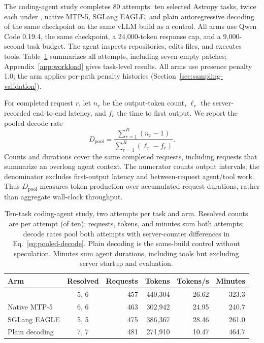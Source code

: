 The coding-agent study completes 80 attempts: ten selected Astropy tasks, twice each under \sys{}, native MTP-5, SGLang EAGLE, and plain autoregressive decoding of the same checkpoint on the same vLLM build as a control. All arms use Qwen Code 0.19.4, the same checkpoint, a 24,000-token response cap, and a 9,000-second task budget. The agent inspects repositories, edits files, and executes tools. Table~\ref{tab:agent-study} summarizes all attempts, including seven empty patches; Appendix~\ref{app:workload} gives task-level results. All arms use presence penalty 1.0; the \sys{} arm applies per-path penalty histories (Section~\ref{sec:sampling-validation}).

For completed request $r$, let $n_r$ be the output-token count, $\ell_r$ the server-recorded end-to-end latency, and $f_r$ the time to first output. We report the pooled decode rate
\begin{equation}
 D_{\mathrm{pool}} =
 \frac{\sum_{r=1}^{R}(n_r-1)}{\sum_{r=1}^{R}(\ell_r-f_r)}.
 \label{eq:pooled-decode}
\end{equation}
Counts and durations cover the same completed requests, including requests that summarize an overlong agent context. The numerator counts output intervals; the denominator excludes first-output latency and between-request agent/tool work. Thus $D_{\mathrm{pool}}$ measures token production over accumulated request durations, rather than aggregate wall-clock throughput.

\begin{table}[t]
\caption{Ten-task coding-agent study, two attempts per task and arm. Resolved counts are per attempt (of ten); requests, tokens, and minutes sum both attempts; decode rates pool both attempts with server-counter differences in Eq.~\ref{eq:pooled-decode}. Plain decoding is the same-build control without speculation. Minutes sum agent durations, including tools but excluding server startup and evaluation.}
\label{tab:agent-study}
\centering\small
\setlength{\tabcolsep}{3pt}
\begin{tabular}{@{}lcrrrr@{}}
\toprule
Arm & Resolved & Requests & Tokens & Tokens/s & Minutes \\
\midrule
\sys{} & 5, 6 & 457 & 440,304 & 26.62 & 323.3 \\
Native MTP-5 & 6, 6 & 463 & 302,942 & 24.95 & 240.7 \\
SGLang EAGLE & 5, 5 & 475 & 386,367 & 28.46 & 261.0 \\
Plain decoding & 7, 7 & 481 & 271,910 & 10.47 & 464.7 \\
\bottomrule
\end{tabular}
\end{table}


